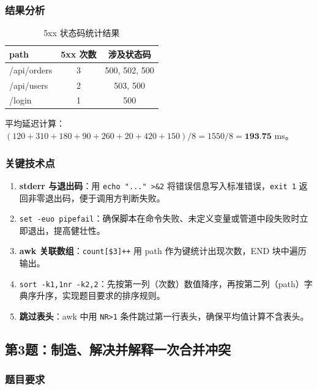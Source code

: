 \documentclass[12pt,a4paper]{article}
\begin{document}
\subsubsection{结果分析}

\begin{table}[H]
\centering
\caption{5xx 状态码统计结果}
\label{tab:5xx}
\begin{tabular}{lcc}
\toprule
path & 5xx 次数 & 涉及状态码 \\
\midrule
/api/orders & 3 & 500, 502, 500 \\
/api/users & 2 & 503, 500 \\
/login & 1 & 500 \\
\bottomrule
\end{tabular}
\end{table}

\noindent 平均延迟计算：$(120+310+180+90+260+20+420+150)/8 = 1550/8 = \textbf{193.75}$ ms。

\subsubsection{关键技术点}

\begin{enumerate}
    \item \textbf{stderr 与退出码}：用 \texttt{echo "..." >\&2} 将错误信息写入标准错误，\texttt{exit 1} 返回非零退出码，便于调用方判断失败。
    \item \texttt{set -euo pipefail}：确保脚本在命令失败、未定义变量或管道中段失败时立即退出，提高健壮性。
    \item \textbf{awk 关联数组}：\texttt{count[\$3]++} 用 path 作为键统计出现次数，END 块中遍历输出。
    \item \texttt{sort -k1,1nr -k2,2}：先按第一列（次数）数值降序，再按第二列（path）字典序升序，实现题目要求的排序规则。
    \item \textbf{跳过表头}：awk 中用 \texttt{NR>1} 条件跳过第一行表头，确保平均值计算不含表头。
\end{enumerate}

\subsection{第3题：制造、解决并解释一次合并冲突}

\subsubsection{题目要求}
\end{document}
